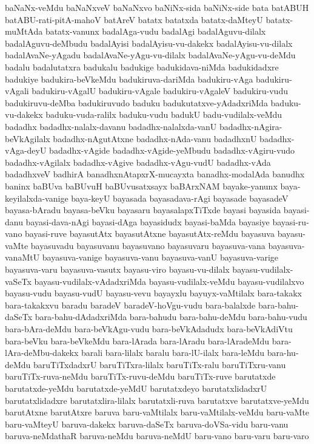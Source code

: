 {baNaNx-veMdu
baNaNxveV
baNaNxvo
baNiNx-sida
baNiNx-side
bata
batABUH
batABU-rati-pitA-mahoV
batAreV
batatx
batatxda
batatx-daMteyU
batatx-muMtAda
batatx-vanunx
badalAga-vudu
badalAgi
badalAguvu-dilalx
badalAguvu-deMbudu
badalAyisi
badalAyisu-vu-dakekx
badalAyisu-vu-dilalx
badalAvaNe-yAgadu
badalAvaNe-yAgu-vu-dilalx
badalAvaNe-yAgu-vu-deMdu
badalu
badalutatxra
badukalu
badukige
badukidava-niMda
badukidadxre
badukiye
badukira-beVkeMdu
badukiruva-dariMda
badukiru-vAga
badukiru-vAgali
badukiru-vAgalU
badukiru-vAgale
badukiru-vAgaleV
badukiru-vudu
badukiruvu-deMba
badukiruvudo
baduku
badukutatxve-yAdadxriMda
baduku-vu-dakekx
baduku-vuda-ralilx
baduku-vudu
badukU
badu-vudilalx-veMdu
badadhx
badadhx-nalalx-davanu
badadhx-nalalxda-vanU
badadhx-nAgira-beVkAgilalx
badadhx-nAgutAtxne
badadhx-nAda-vanu
badadhxnU
badadhx-vAga-deyU
badadhx-vAgide
badadhx-vAgide-yeMbudu
badadhx-vAgiru-vudo
badadhx-vAgilalx
badadhx-vAgive
badadhx-vAgu-vudU
badadhx-vAda
badadhxveV
badhirA
banadhxnAtapxrX-mucayxta
banadhx-modalAda
banudhx
baninx
baBUva
baBUvuH
baBUvusatxsayx
baBArxNAM
bayake-yanunx
baya-keyilalxda-vanige
baya-keyU
bayasada
bayasadava-rAgi
bayasade
bayasadeV
bayasa-bAradu
bayasa-beVku
bayasaru
bayasalapxTiTxde
bayasi
bayasida
bayasi-danu
bayasi-dava-nAgi
bayasi-dAga
bayasidudx
bayasi-baMda
bayasiye
bayasi-ru-vano
bayasi-ruve
bayasutAtx
bayasutAtxne
bayasutAtx-reMdu
bayasuva
bayasu-vaMte
bayasuvadu
bayasuvanu
bayasuvano
bayasuvaru
bayasuva-vana
bayasuva-vanaMtU
bayasuva-vanige
bayasuva-vanu
bayasuva-vanU
bayasuva-varige
bayasuva-varu
bayasuva-vasutx
bayasu-viro
bayasu-vu-dilalx
bayasu-vudilalx-vaSeTx
bayasu-vudilalx-vAdadxriMda
bayasu-vudilalx-veMdu
bayasu-vudilalxvo
bayasu-vudu
bayasu-vudU
bayasu-vevu
bayayxlu
bayuyx-vaMtilalx
bara-takakx
bara-takakxvu
baradu
baradeV
baradeV-hoVgu-vudu
bara-balalxde
bara-bahu-daSeTx
bara-bahu-dAdadxriMda
bara-bahudu
bara-bahu-deMdu
bara-bahu-vudu
bara-bAra-deMdu
bara-beVkAgu-vudu
bara-beVkAdadudx
bara-beVkAdiVtu
bara-beVku
bara-beVkeMdu
bara-lArada
bara-lAradu
bara-lAradeMdu
bara-lAra-deMbu-dakekx
barali
bara-lilalx
baralu
bara-lU-ilalx
bara-leMdu
bara-hu-deMdu
baruTiTxdadxrU
baruTiTxra-lilalx
baruTiTx-ralu
baruTiTxru-vanu
baruTiTx-ruva-neMdu
baruTiTx-ruvu-deMdu
baruTiTx-ruve
barutatxde
barutatxde-yeMdu
barutatxde-yeMdU
barutatxdeyo
barutatxlidadxrU
barutatxlidadxre
barutatxlira-lilalx
barutatxli-ruva
barutatxve
barutatxve-yeMdu
barutAtxne
barutAtxre
baruva
baru-vaMtilalx
baru-vaMtilalx-veMdu
baru-vaMte
baru-vaMteyU
baruva-dakekx
baruva-daSeTx
baruva-doVSa-vidu
baru-vanu
baruva-neMdathaR
baruva-neMdu
baruva-neMdU
baru-vano
baru-varu
baru-varo
}
